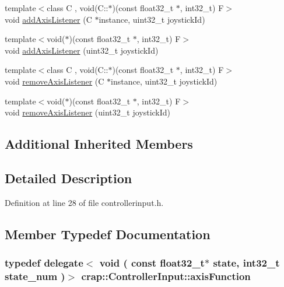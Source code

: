 \begin{DoxyCompactItemize}
{\footnotesize template$<$class C , void(\+C\+::$\ast$)(const float32\+\_\+t $\ast$, int32\+\_\+t) F$>$ }\\void \hyperlink{classcrap_1_1_controller_input_a649af2b9bb33ff950b452e8342135041}{add\+Axis\+Listener} (C $\ast$instance, uint32\+\_\+t joystick\+Id)
\item 
{\footnotesize template$<$void($\ast$)(const float32\+\_\+t $\ast$, int32\+\_\+t) F$>$ }\\void \hyperlink{classcrap_1_1_controller_input_af7f97ae163de5d532072c82c81ed085f}{add\+Axis\+Listener} (uint32\+\_\+t joystick\+Id)
\item 
{\footnotesize template$<$class C , void(\+C\+::$\ast$)(const float32\+\_\+t $\ast$, int32\+\_\+t) F$>$ }\\void \hyperlink{classcrap_1_1_controller_input_a7051e4c13a6851f73294fbd95bbf3b75}{remove\+Axis\+Listener} (C $\ast$instance, uint32\+\_\+t joystick\+Id)
\item 
{\footnotesize template$<$void($\ast$)(const float32\+\_\+t $\ast$, int32\+\_\+t) F$>$ }\\void \hyperlink{classcrap_1_1_controller_input_ad0370837e1f78ce0bde40a1848272ec7}{remove\+Axis\+Listener} (uint32\+\_\+t joystick\+Id)
\end{DoxyCompactItemize}
\subsection*{Additional Inherited Members}


\subsection{Detailed Description}


Definition at line 28 of file controllerinput.\+h.



\subsection{Member Typedef Documentation}
\hypertarget{classcrap_1_1_controller_input_aea9c7f407b4c8fb0cea63aa69acccbe1}{}
\subsubsection[{axis\+Function}]{\setlength{\rightskip}{0pt plus 5cm}typedef {\bf delegate}$<$ void ( const {\bf float32\+\_\+t}$\ast$ state, int32\+\_\+t state\+\_\+num )$>$ {\bf crap\+::\+Controller\+Input\+::axis\+Function}}\label{classcrap_1_1_controller_input_aea9c7f407b4c8fb0cea63aa69acccbe1}


